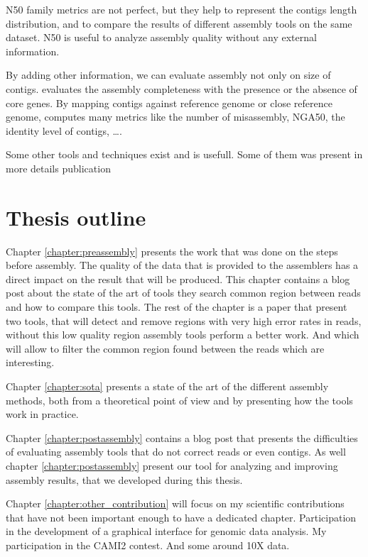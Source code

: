 \documentclass[./main.tex]{subfiles}
\begin{document}
N50 family metrics are not perfect, but they help to represent the contigs length distribution, and to compare the results of different assembly tools on the same dataset. N50 is useful to analyze assembly quality without any external information.

By adding other information, we can evaluate assembly not only on size of contigs. \cite{busco} evaluates the assembly completeness with the presence or the absence of core genes. By mapping contigs against reference genome or close reference genome, \cite{quast} computes many metrics like the number of misassembly, NGA50, the identity level of contigs, …. 

Some other tools and techniques exist and is usefull. Some of them was present in more details publication \cite{seq_assembly_demystified}

\section{Thesis outline}

Chapter \ref{chapter:preassembly} presents the work that was done on the steps before assembly. The quality of the data that is provided to the assemblers has a direct impact on the result that will be produced. This chapter contains a blog post about the state of the art of tools they search common region between reads and how to compare this tools. The rest of the chapter is a paper that present two tools, \yacrd that will detect and remove regions with very high error rates in reads, without this low quality region assembly tools perform a better work. And \fpa which will allow to filter the common region found between the reads which are interesting.

Chapter \ref{chapter:sota} presents a state of the art of the different assembly methods, both from a theoretical point of view and by presenting how the tools work in practice.

Chapter \ref{chapter:postassembly} contains a blog post that presents the difficulties of evaluating assembly tools that do not correct reads or even contigs. As well chapter \ref{chapter:postassembly} present our tool for analyzing and improving assembly results, \knot that we developed during this thesis.

Chapter \ref{chapter:other_contribution} will focus on my scientific contributions that have not been important enough to have a dedicated chapter. Participation in the development of a graphical interface for genomic data analysis. My participation in the CAMI2 contest. And some around 10X data.

\end{document}
